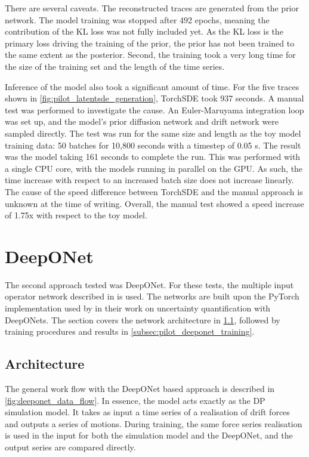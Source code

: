 There are several caveats. The reconstructed traces are generated from the prior network. The model training was stopped
after 492 epochs, meaning the contribution of the KL loss was not fully included yet. As the KL loss is the primary loss
driving the training of the prior, the prior has not been trained to the same extent as the posterior. Second, the
training took a very long time for the size of the training set and the length of the time series.

Inference of the model also took a significant amount of time. For the five traces shown in
\cref{fig:pilot_latentsde_generation}, TorchSDE took 937 seconds. A manual test was performed to investigate the cause.
An Euler-Maruyama integration loop was set up, and the model's prior diffusion network and drift network were sampled
directly. The test was run for the same size and length as the toy model training data: 50 batches for 10,800 seconds
with a timestep of 0.05 s. The result was the model taking 161 seconds to complete the run. This was performed with a
single CPU core, with the models running in parallel on the GPU. As such, the time increase with respect to an increased
batch size does not increase linearly. The cause of the speed difference between TorchSDE and the manual approach is
unknown at the time of writing. Overall, the manual test showed a speed increase of 1.75x with respect to the toy model.

\section{DeepONet}
\label{sec:pilot_deeponet}
The second approach tested was DeepONet. For these tests, the multiple input operator network described in
\textcite{jinMIONetLearningMultipleInput2022} is used. The networks are built upon the PyTorch implementation used by
\textcite{moyaDeepONetgridUQTrustworthyDeep2023} in their work on uncertainty quantification with DeepONets. The section covers the network architecture in \cref{subsec:pilot_deeponet_arch}, followed by training procedures and results in \cref{subsec:pilot_deeponet_training}.

\subsection{Architecture}
\label{subsec:pilot_deeponet_arch}

The general work flow with the DeepONet based approach is described in \cref{fig:deeponet_data_flow}. In essence, the
model acts exactly as the DP simulation model. It takes as input a time series of a realisation of drift forces and
outputs a series of motions. During training, the same force series realisation is used in the input for both the
simulation model and the DeepONet, and the output series are compared directly.

